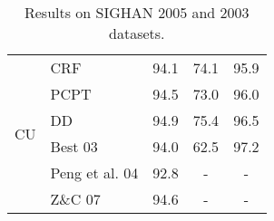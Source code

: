 \begin{table}
\begin{small}
\begin{tabular}{ l | l | c | c | c   }
\hline
\multirow{6}{*}{CU} & CRF   & 94.1   & 74.1   & 95.9 \\
& PCPT  & 94.5   & 73.0  &  96.0 \\
& DD &  {94.9}  & {75.4} &  96.5 \\
\cline{2-5}
&  Best 03   & 94.0   &  62.5  &  {97.2} \\
& Peng et al. 04      & 92.8 &   - & - \\
& Z\&C 07      & 94.6 &   - & - \\


\end{tabular} 
\caption{Results on SIGHAN 2005 and 2003 datasets. }\label{tbl:results}
\end{small}
\end{table}

